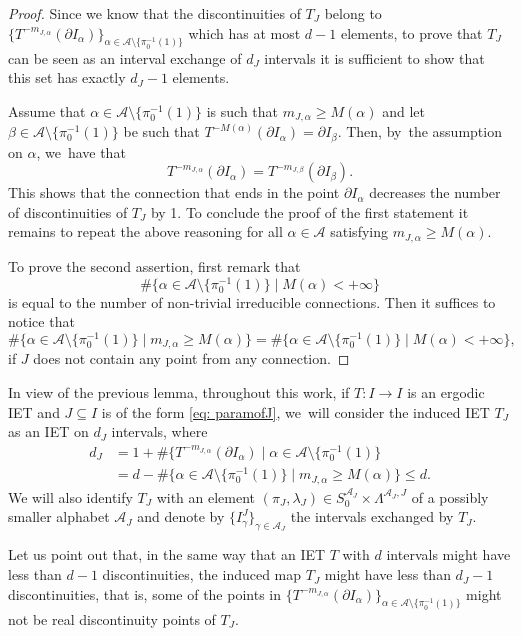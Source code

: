 \documentclass[10pt,a4paper]{amsart}
\theoremstyle{plain}
\theoremstyle{definition}
\newcommand{\A}{\mathcal{A}}
\begin{document}
\skpt
\begin{proof}
Since we know that the discontinuities of $T_J$ belong to $\{T^{-m_{J,\alpha}}(\partial I_{\alpha})\}_{\alpha\in \A\setminus \{\pi_0^{-1}(1)\}}$ which has at most $d-1$ elements, to prove that $T_J$ can be seen as an interval exchange of $d_J$ intervals it is sufficient to show that this set has exactly $d_J-1$ elements.

Assume that $\alpha\in\A\setminus \{\pi_0^{-1}(1)\}$ is such that $m_{J,\alpha}\ge M(\alpha)$ and let $\beta\in \A\setminus \{\pi_0^{-1}(1)\}$ be such that $T^{-M(\alpha)}(\partial I_{\alpha})=\partial I_{\beta}$. Then, by~the assumption on $\alpha$, we~have that
\[
T^{-m_{J,\alpha}}(\partial I_{\alpha})=T^{-m_{J,\beta}}(\partial I_{\beta}).
\]
This shows that the connection that ends in the point $\partial I_{\alpha}$ decreases the number of discontinuities of $T_J$ by 1.
To conclude the proof of the first statement it remains to repeat the above reasoning for all $\alpha\in\A$ satisfying $m_{J,\alpha}\ge M(\alpha)$.

To prove the second assertion, first remark that
\[
\#\{\alpha\in\A\setminus \{\pi_0^{-1}(1)\} \mid M(\alpha) < +\infty\}
\]
is equal to the number of non-trivial irreducible connections. Then it suffices to notice that
\[
\#\{\alpha\in\A\setminus \{\pi_0^{-1}(1)\} \mid m_{J,\alpha}\ge M(\alpha)\} = \#\{\alpha\in\A\setminus \{\pi_0^{-1}(1)\} \mid M(\alpha) < +\infty\},
\]
if $J$ does not contain any point from any connection.
\end{proof}

In view of the previous lemma, throughout this work, if $T: I \to I$ is an ergodic IET and $J \subseteq I$ is of the form \eqref{eq: paramofJ}, we~will consider the induced IET $T_J$ as an IET on $d_J$ intervals, where
\begin{align*}
d_J &= 1 + \# \{T^{-m_{J,\alpha}}(\partial I_{\alpha}) \mid \alpha\in \A\setminus \{\pi_0^{-1}(1)\}\\
&= d -\#\{\alpha\in\A\setminus \{\pi_0^{-1}(1)\} \mid m_{J,\alpha}\ge M(\alpha)\} \leq d.
\end{align*}
We will also identify $T_J$ with an element $(\pi_J, \lambda_J) \in S_0^{\A_J} \times \Lambda^{\A_J, J}$ of a possibly smaller alphabet $\A_J$ and denote by $\{I_\gamma^J\}_{\gamma \in \A_J}$ the intervals exchanged by $T_J$.

Let us point out that, in the same way that an IET $T$ with $d$ intervals might have less than $d - 1$ discontinuities, the induced map $T_J$ might have less than $d_J - 1$ discontinuities, that is, some of the points in $
\{T^{-m_{J,\alpha}}(\partial I_{\alpha})\}_{\alpha\in \A\setminus \{\pi_0^{-1}(1)\}}$ might not be real discontinuity points of $T_J$.
\end{document}
